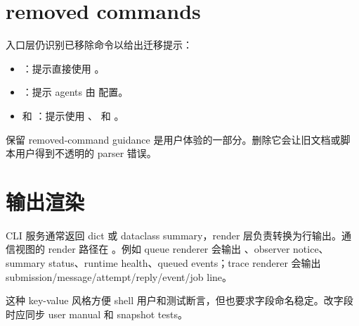 \section{removed commands}

入口层仍识别已移除命令以给出迁移提示：

\begin{itemize}
  \item {}：提示直接使用 。
  \item {}：提示 agents 由  配置。
  \item {} 和 ：提示使用 、 和 。
\end{itemize}

保留 removed-command guidance 是用户体验的一部分。删除它会让旧文档或脚本用户得到不透明的 parser 错误。

\section{输出渲染}

CLI 服务通常返回 dict 或 dataclass summary，render 层负责转换为行输出。通信视图的 render 路径在 。例如 queue renderer 会输出 、observer notice、summary status、runtime health、queued events；trace renderer 会输出 submission/message/attempt/reply/event/job line。

这种 key-value 风格方便 shell 用户和测试断言，但也要求字段命名稳定。改字段时应同步 user manual 和 snapshot tests。
